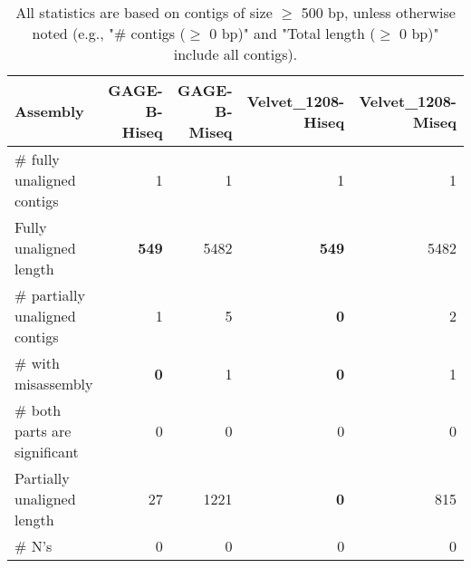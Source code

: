\documentclass[12pt,a4paper]{article}
\begin{document}
\begin{table}[ht]
\begin{center}
\caption{All statistics are based on contigs of size $\geq$ 500 bp, unless otherwise noted (e.g., "\# contigs ($\geq$ 0 bp)" and "Total length ($\geq$ 0 bp)" include all contigs).}
\begin{tabular}{|l*{4}{|r}|}
\hline
Assembly & GAGE-B-Hiseq & GAGE-B-Miseq & Velvet\_1208-Hiseq & Velvet\_1208-Miseq \\ \hline
\# fully unaligned contigs & 1 & 1 & 1 & 1 \\ \hline
Fully unaligned length & {\bf 549} & 5482 & {\bf 549} & 5482 \\ \hline
\# partially unaligned contigs & 1 & 5 & {\bf 0} & 2 \\ \hline
\hspace{5mm}\# with misassembly & {\bf 0} & 1 & {\bf 0} & 1 \\ \hline
\hspace{5mm}\# both parts are significant & 0 & 0 & 0 & 0 \\ \hline
Partially unaligned length & 27 & 1221 & {\bf 0} & 815 \\ \hline
\# N's & 0 & 0 & 0 & 0 \\ \hline
\end{tabular}
\end{center}
\end{table}
\end{document}
